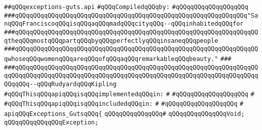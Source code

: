 \label{src/lib/std/src/exceptions-guts.api}
\verb|##qQQqexceptions-guts.api|\newline
\newline
\verb|#qQQqCompiledqQQqby:|\newline
\verb|#qQQqqQQqqQQqqQQqqQQq|\newline
\newline
\newline
\newline
\verb|###qQQqqQQqqQQqqQQqqQQqqQQqqQQqqQQqqQQqqQQqqQQqqQQqqQQqqQQqqQQqqQQq"SanqQQqFranciscoqQQqisqQQqaqQQqmadqQQqcityqQQq--qQQqinhabitedqQQqfor|\newline
\verb|###qQQqqQQqqQQqqQQqqQQqqQQqqQQqqQQqqQQqqQQqqQQqqQQqqQQqqQQqqQQqqQQqqQQqtheqQQqmostqQQqpartqQQqbyqQQqperfectlyqQQqinsaneqQQqpeople|\newline
\verb|###qQQqqQQqqQQqqQQqqQQqqQQqqQQqqQQqqQQqqQQqqQQqqQQqqQQqqQQqqQQqqQQqqQQqwhoseqQQqwomenqQQqareqQQqofqQQqaqQQqremarkableqQQqbeauty."|\newline
\verb|###|\newline
\verb|###qQQqqQQqqQQqqQQqqQQqqQQqqQQqqQQqqQQqqQQqqQQqqQQqqQQqqQQqqQQqqQQqqQQqqQQqqQQqqQQqqQQqqQQqqQQqqQQqqQQqqQQqqQQqqQQqqQQqqQQqqQQqqQQqqQQqqQQqqQQqqQQq--qQQqRudyardqQQqKipling|\newline
\newline
\newline
\verb|#qQQqThisqQQqapiqQQqisqQQqimplementedqQQqin:|\newline
\verb|#|\newline
\verb|#qQQqqQQqqQQqqQQqqQQq|\newline
\verb|#|\newline
\verb|#qQQqThisqQQqapiqQQqisqQQqincludedqQQqin:|\newline
\verb|#|\newline
\verb|#qQQqqQQqqQQqqQQqqQQq|\newline
\verb|#|\newline
\verb|apiqQQqExceptions_GutsqQQq{|\newline
\verb|qQQqqQQqqQQqqQQq#|\newline
\verb|qQQqqQQqqQQqqQQqVoid;|\newline
\verb|qQQqqQQqqQQqqQQqException;|\newline
\newline
